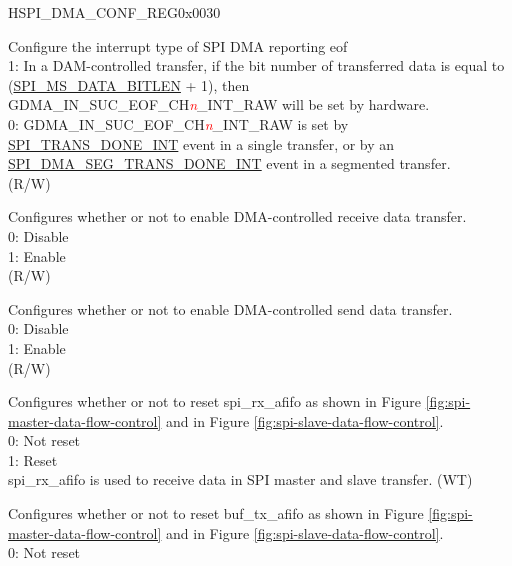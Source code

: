 \addtocounter{Regfloat}{-1}
\begin{register}{H}{SPI\_DMA\_CONF\_REG}{0x0030}
\begin{regdesc}\begin{reglist}
\item [Continued from the previous page...]

\label{fielddesc:SPIRXEOFEN}\item [SPI\_RX\_EOF\_EN] Configure the interrupt type of SPI DMA reporting eof\\
1: In a DAM-controlled transfer, if the bit number of transferred data is equal to (\hyperref[fielddesc:SPIMSDATABITLEN]{SPI\_MS\_DATA\_BITLEN} + 1), then GDMA\_IN\_SUC\_EOF\_CH\textcolor{red}{\it{n}}\_INT\_RAW will be set by hardware. \\
0: GDMA\_IN\_SUC\_EOF\_CH\textcolor{red}{\it{n}}\_INT\_RAW is set by \hyperref[int:SPITRANSDONEINT]{SPI\_TRANS\_DONE\_INT} event in a single transfer, or by an \hyperref[int:SPIDMASEGTRANSDONEINT]{SPI\_DMA\_SEG\_TRANS\_DONE\_INT} event in a segmented transfer. \\
(R/W)
\label{fielddesc:SPIDMARXENA}\item [SPI\_DMA\_RX\_ENA] Configures whether or not to enable DMA-controlled receive data transfer. \\
0: Disable \\
1: Enable \\
(R/W)
\label{fielddesc:SPIDMATXENA}\item [SPI\_DMA\_TX\_ENA] Configures whether or not to enable DMA-controlled send data transfer. \\
0: Disable \\
1: Enable \\
(R/W)
\label{fielddesc:SPIRXAFIFORST}\item [SPI\_RX\_AFIFO\_RST] Configures whether or not to reset spi\_rx\_afifo as shown in Figure \ref{fig:spi-master-data-flow-control} and in Figure  \ref{fig:spi-slave-data-flow-control}. \\
0: Not reset \\
1: Reset \\
spi\_rx\_afifo is used to receive data in SPI master and slave transfer. (WT)
\label{fielddesc:SPIBUFAFIFORST}\item [SPI\_BUF\_AFIFO\_RST] Configures whether or not to reset buf\_tx\_afifo as shown in Figure \ref{fig:spi-master-data-flow-control} and in Figure  \ref{fig:spi-slave-data-flow-control}. \\
0: Not reset \\

\end{reglist}
\end{regdesc}
\end{register}
